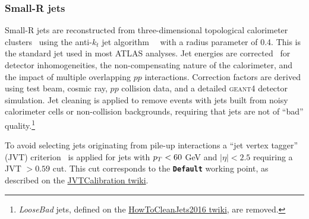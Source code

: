 \subsubsection{Small-R jets}
Small-R jets are reconstructed from three-dimensional topological calorimeter 
clusters~\cite{ATLAS-TopoClustering} using the anti-$k_t$ jet 
algorithm~~\cite{antikt_algorithm} with a radius parameter of 0.4. This is the standard jet used in most ATLAS analyses.
Jet energies are corrected~\cite{ATLAS-JES-RUN2} for detector inhomogeneities, the non-compensating nature of the calorimeter, and the impact of multiple overlapping $pp$ interactions. Correction factors are derived using test beam, cosmic ray, $pp$ collision data, and a detailed \textsc{geant4} detector simulation.
Jet cleaning is applied to remove events with jets built from noisy
calorimeter cells or non-collision backgrounds, requiring that jets
are not of ``bad'' quality.\footnote{\textit{LooseBad} jets, 
defined on the \href{https://twiki.cern.ch/twiki/bin/view/AtlasProtected/HowToCleanJets2016}{HowToCleanJets2016 twiki}, 
are removed.}

To avoid selecting jets originating from pile-up interactions a ``jet vertex tagger'' (JVT) criterion~\cite{ATLAS-JVTPaper} is applied for jets with $\pt < 60$ GeV and $|\eta|< 2.5$ requiring a JVT $ > 0.59$ cut. This cut corresponds to the \texttt{\textbf{Default}} working point, as described on the \href{https://twiki.cern.ch/twiki/bin/view/AtlasProtected/JVTCalibration}{JVTCalibration twiki}.



